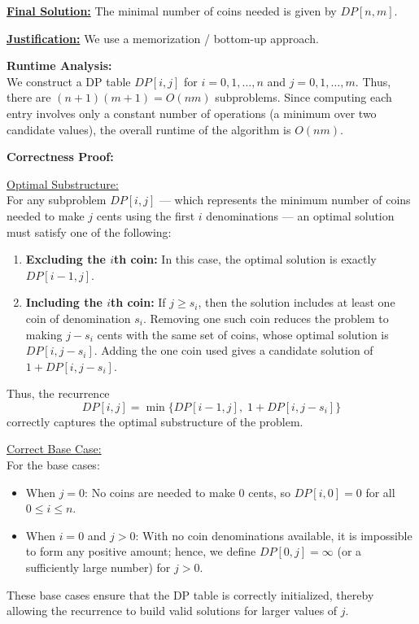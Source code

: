 \documentclass[11pt]{article}
\begin{document}
    \medskip
    
    \underline{\textbf{Final Solution:}} The minimal number of coins needed is given by \(DP[n,m]\).
    
    \medskip
    
    \underline{\textbf{Justification:}} We use a memorization / bottom-up approach. 

    \textbf{Runtime Analysis:} \\
    We construct a DP table \(DP[i,j]\) for \(i=0,1,\dots,n\) and \(j=0,1,\dots,m\). Thus, there are \((n+1)(m+1)=O(nm)\) subproblems. Since computing each entry involves only a constant number of operations (a minimum over two candidate values), the overall runtime of the algorithm is \(O(nm)\).
    
    \bigskip
    
    \textbf{Correctness Proof:}
    
    \underline{Optimal Substructure:} \\
    For any subproblem \(DP[i,j]\) — which represents the minimum number of coins needed to make \(j\) cents using the first \(i\) denominations — an optimal solution must satisfy one of the following:
    \begin{enumerate}
        \item \textbf{Excluding the \(i\)th coin:} In this case, the optimal solution is exactly \(DP[i-1,j]\).
        \item \textbf{Including the \(i\)th coin:} If \(j \ge s_i\), then the solution includes at least one coin of denomination \(s_i\). Removing one such coin reduces the problem to making \(j-s_i\) cents with the same set of coins, whose optimal solution is \(DP[i,j-s_i]\). Adding the one coin used gives a candidate solution of \(1 + DP[i,j-s_i]\).
    \end{enumerate}
    Thus, the recurrence
    \[
    DP[i,j]=\min\{DP[i-1,j],\; 1+DP[i,j-s_i]\}
    \]
    correctly captures the optimal substructure of the problem.
    
    \medskip
    
    \underline{Correct Base Case:} \\
    For the base cases:
    \begin{itemize}
        \item When \(j=0\): No coins are needed to make 0 cents, so \(DP[i,0]=0\) for all \(0\le i\le n\).
        \item When \(i=0\) and \(j>0\): With no coin denominations available, it is impossible to form any positive amount; hence, we define \(DP[0,j]=\infty\) (or a sufficiently large number) for \(j>0\).
    \end{itemize}
    These base cases ensure that the DP table is correctly initialized, thereby allowing the recurrence to build valid solutions for larger values of \(j\).
    
    \newpage

    
    
\end{document}
